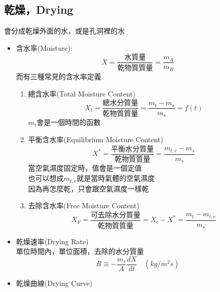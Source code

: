 \documentclass[../main.tex]{subfiles}
\begin{document}
\subsection{乾燥，Drying}
會分成乾燥外面的水，或是孔洞裡的水
\begin{itemize}
  \item 含水率(Moisture):
  \begin{equation}
    X = \frac{\text{水質量}}{\text{乾物質質量}} = \frac{m_A}{m_B}
  \end{equation}
  而有三種常見的含水率定義
  \begin{enumerate}
    \item 總含水率(Total Moisture Content)
    \begin{equation}
      X_t = \frac{\text{總水分質量}}{\text{乾物質質量}} = \frac{m_t-m_s}{m_s} = f(t)
    \end{equation}
    $m_t$會是一個時間的函數
    \item 平衡含水率(Equilibrium Moisture Content)
    \begin{equation}
      X^\ast = \frac{\text{平衡水分質量}}{\text{乾物質質量}} = \frac{m_{t,e} - m_s}{m_s}
    \end{equation}
    當空氣濕度固定時，值會是一個定值\\
    也可以想成$m_{t,e}$就是當時氣體的空氣濕度\\
    因為再怎麼乾，只會跟空氣濕度一樣乾
    \item 去除含水率(Free Moisture Content)
    \begin{equation}
      X_F = \frac{\text{可去除水分質量}}{\text{乾物質質量}} = X_t - X^\ast = \frac{m_t - m_{t,e}}{m_s}
    \end{equation}
  \end{enumerate}
  \item 乾燥速率(Drying Rate)\\
  單位時間內，單位面積，去除的水分質量
  \begin{equation}
    R \equiv -\frac{m_s}{A}\frac{dX}{dt} \quad (kg/m^2 s)
  \end{equation}
  \item 乾燥曲線(Drying Curve)
  \begin{figure}[H]
    \centering
\end{figure}
\end{itemize}
\end{document}
